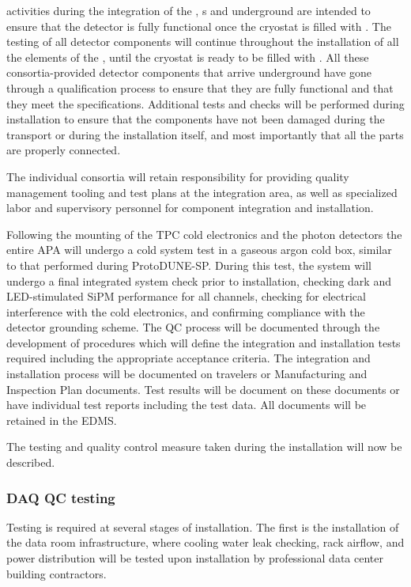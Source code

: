 activities during the integration of the , s and  underground %
are intended to ensure that the detector is %
fully functional once the cryostat is filled with . 
The testing of all detector components will continue throughout the installation of all the elements of the , until the cryostat is ready to be filled with .  All these consortia-provided detector components that arrive underground have gone through a qualification process to ensure that they are fully functional and that they meet the  specifications. Additional tests and checks will be performed during installation  to ensure that the components have not been damaged during the transport or during the installation itself, and most importantly that all the parts are properly connected.

The individual consortia will retain responsibility for providing quality management tooling and test plans at the integration area, as well as specialized labor and supervisory personnel for component integration and installation.

Following the mounting of the TPC cold electronics and the photon detectors the entire APA will undergo a cold system test in a gaseous argon cold box, similar to that performed during ProtoDUNE-SP. During this test, the system will undergo a final integrated system check prior to installation, checking dark and LED-stimulated SiPM performance for all channels, checking for electrical interference with the cold electronics, and confirming compliance with the detector grounding scheme.
The QC process will be documented through the development of procedures which will define the integration and installation tests required including the appropriate acceptance criteria. 
The integration and installation process will be documented on travelers or Manufacturing and Inspection Plan documents. 
Test results will be document on these documents or have individual test reports including the test data. 
All documents will be retained in the EDMS.

The testing and quality control measure taken during the installation will now be described.


\subsubsection{DAQ QC testing}

Testing is required at several stages of  installation.  The first is the installation of the data room infrastructure, where cooling water leak checking, rack airflow, and power distribution will be tested upon installation by professional data center building contractors.

